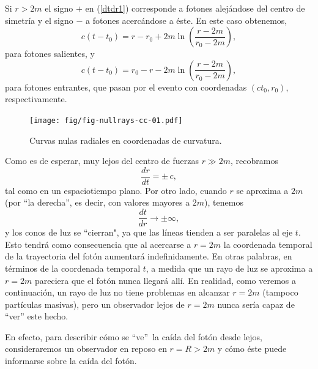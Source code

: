 Si $r>2m$ el signo $+$ en (\ref{dtdr1}) corresponde a fotones alejándose del centro de simetría y el signo $-$ a fotones acercándose a éste. En este caso obtenemos,
\begin{equation}
 c(t-t_0)=r-r_0+2m\ln\left(\frac{r-2m}{r_0-2m}\right),  \label{rtfs}
\end{equation}
para fotones salientes, y
\begin{equation}
 c(t-t_0)=r_0-r-2m\ln\left(\frac{r-2m}{r_0-2m}\right), \label{rtfe}
\end{equation}
para fotones entrantes, que pasan por el evento con coordenadas $(ct_0,r_0)$, respectivamente.
\begin{figure}[H]
 \begin{center}
\texttt{[image: fig/fig-nullrays-cc-01.pdf]}
\caption{Curvas nulas radiales en coordenadas de curvatura.}
\label{fig:nullrays-cc}
\end{center}
\end{figure}
Como es de esperar, muy lejos del centro de fuerzas $r\gg 2m$, recobramos
\begin{equation}
\frac{dr}{dt}=\pm\, c,
\end{equation}
tal como en un espaciotiempo plano. Por otro lado, cuando $r$ se aproxima a $2m$ (por ``la derecha'', es decir, con valores mayores a $2m$), tenemos
\begin{equation}
\frac{dt}{dr}\rightarrow\pm\infty,
\end{equation}
y los conos de luz se ``cierran", ya que las líneas tienden a ser
paralelas al eje $t$. Esto tendrá como consecuencia que al acercarse a $r=2m$ la coordenada temporal de la trayectoria del fotón aumentará indefinidamente. En otras palabras, en términos de la coordenada temporal $t$, a medida que un rayo de luz se aproxima a $r=2m$ pareciera que el fotón nunca llegará allí. En realidad, como veremos a continuación, un rayo de luz no tiene problemas en alcanzar $r=2m$ (tampoco partículas masivas), pero un observador lejos de $r=2m$ nunca sería capaz de ``ver'' este hecho.

En efecto, para describir cómo se ``ve''\, la caída del fotón desde lejos, consideraremos un observador en reposo en $r=R>2m$ y cómo éste puede informarse sobre la caída del fotón.

